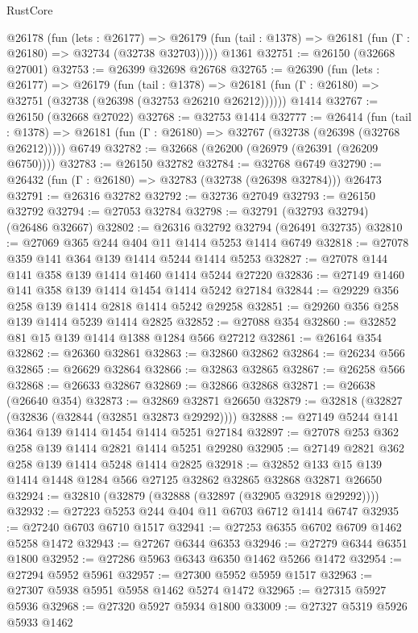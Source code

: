 \begin{lexlean}{RustCore}
\begin{coremodule}
    @26178
      (fun (lets : @26177) =>
      @26179 (fun (tail : @1378) => @26181 (fun (Γ : @26180) => @32734 (@32738 @32703)))))
    @1361
@32751 := @26150 (@32668 @27001)
@32753 := @26399 @32698 @26768
@32765 := @26390
    (fun (lets : @26177) =>
    @26179
      (fun (tail : @1378) =>
      @26181 (fun (Γ : @26180) => @32751 (@32738 (@26398 (@32753 @26210 @26212))))))
    @1414
@32767 := @26150 (@32668 @27022)
@32768 := @32753 @1414
@32777 := @26414
    (fun (tail : @1378) => @26181 (fun (Γ : @26180) => @32767 (@32738 (@26398 (@32768 @26212)))))
    @6749
@32782 := @32668 (@26200 (@26979 (@26391 (@26209 @6750))))
@32783 := @26150 @32782
@32784 := @32768 @6749
@32790 := @26432 (fun (Γ : @26180) => @32783 (@32738 (@26398 @32784))) @26473
@32791 := @26316 @32782
@32792 := @32736 @27049
@32793 := @26150 @32792
@32794 := @27053 @32784
@32798 := @32791 (@32793 @32794) (@26486 @32667)
@32802 := @26316 @32792 @32794 (@26491 @32735)
@32810 := @27069 @365 @244 @404 @11 @1414 @5253 @1414 @6749
@32818 := @27078 @359 @141 @364 @139 @1414 @5244 @1414 @5253
@32827 := @27078 @144 @141 @358 @139 @1414 @1460 @1414 @5244 @27220
@32836 := @27149 @1460 @141 @358 @139 @1414 @1454 @1414 @5242 @27184
@32844 := @29229 @356 @258 @139 @1414 @2818 @1414 @5242 @29258
@32851 := @29260 @356 @258 @139 @1414 @5239 @1414 @2825
@32852 := @27088 @354
@32860 := @32852 @81 @15 @139 @1414 @1388 @1284 @566 @27212
@32861 := @26164 @354
@32862 := @26360 @32861
@32863 := @32860 @32862
@32864 := @26234 @566
@32865 := @26629 @32864
@32866 := @32863 @32865
@32867 := @26258 @566
@32868 := @26633 @32867
@32869 := @32866 @32868
@32871 := @26638 (@26640 @354)
@32873 := @32869 @32871 @26650
@32879 := @32818 (@32827 (@32836 (@32844 (@32851 @32873 @29292))))
@32888 := @27149 @5244 @141 @364 @139 @1414 @1454 @1414 @5251 @27184
@32897 := @27078 @253 @362 @258 @139 @1414 @2821 @1414 @5251 @29280
@32905 := @27149 @2821 @362 @258 @139 @1414 @5248 @1414 @2825
@32918 := @32852 @133 @15 @139 @1414 @1448 @1284 @566 @27125 @32862 @32865 @32868 @32871 @26650
@32924 := @32810 (@32879 (@32888 (@32897 (@32905 @32918 @29292))))
@32932 := @27223 @5253 @244 @404 @11 @6703 @6712 @1414 @6747
@32935 := @27240 @6703 @6710 @1517
@32941 := @27253 @6355 @6702 @6709 @1462 @5258 @1472
@32943 := @27267 @6344 @6353
@32946 := @27279 @6344 @6351 @1800
@32952 := @27286 @5963 @6343 @6350 @1462 @5266 @1472
@32954 := @27294 @5952 @5961
@32957 := @27300 @5952 @5959 @1517
@32963 := @27307 @5938 @5951 @5958 @1462 @5274 @1472
@32965 := @27315 @5927 @5936
@32968 := @27320 @5927 @5934 @1800
@33009 := @27327
    @5319
    @5926
    @5933
    @1462

\end{coremodule}
\end{lexlean}
